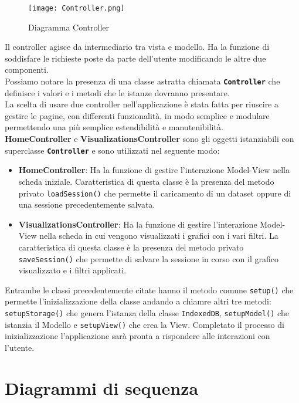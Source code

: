 \begin{figure}[ht]
	\centering
	\texttt{[image: Controller.png]}
	\caption{Diagramma Controller}
  \end{figure}
Il controller agisce da intermediario tra vista e modello. Ha la funzione di soddisfare le richieste poste da parte dell'utente modificando le altre due componenti.\\
Possiamo notare la presenza di una classe astratta chiamata \textbf{\texttt{Controller}} che definisce i valori e i metodi che le istanze dovranno presentare.\\
La scelta di usare due controller nell'applicazione è stata fatta per riuscire a gestire le pagine, con differenti funzionalità, in modo semplice e modulare permettendo una più semplice estendibilità e manutenibilità.\\
\textbf{HomeController} e \textbf{VisualizationsController} sono gli oggetti istanziabili con superclasse \textbf{\texttt{Controller}} e sono utilizzati nel seguente modo: 
\begin{itemize}
	\item \textbf{HomeController}: Ha la funzione di gestire l'interazione Model-View nella scheda iniziale. Caratteristica di questa classe è la presenza del metodo privato \texttt{loadSession()} che permette il caricamento di un dataset oppure di una sessione precedentemente salvata.
	\item \textbf{VisualizationsController}: Ha la funzione di gestire l'interazione Model-View nella scheda in cui vengono visualizzati i grafici con i vari filtri. La caratteristica di questa classe è la presenza del metodo privato \texttt{saveSession()} che permette di salvare la sessione in corso con il grafico visualizzato e i filtri applicati.
\end{itemize}
Entrambe le classi precedentemente citate hanno il metodo comune \texttt{setup()} che permette l'inizializzazione della classe andando a chiamre altri tre metodi: \texttt{setupStorage()} che genera l'istanza della classe \texttt{IndexedDB}, \texttt{setupModel()} che istanzia il Modello e \texttt{setupView()} che crea la View. Completato il processo di inizializzazione l'applicazione sarà pronta a rispondere alle interazioni con l'utente.

\section{Diagrammi di sequenza}
